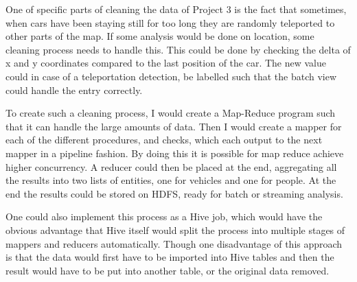 \newpar One of specific parts of cleaning the data of Project 3 is the fact that sometimes, when cars have been staying still for too long they are randomly teleported to other parts of the map. If some analysis would be done on location, some cleaning process needs to handle this. This could be done by checking the delta of x and y coordinates compared to the last position of the car. The new value could in case of a teleportation detection, be labelled such that the batch view could handle the entry correctly.

\newpar To create such a cleaning process, I would create a Map-Reduce program such that it can handle the large amounts of data. Then I would create a mapper for each of the different procedures, and checks, which each output to the next mapper in a pipeline fashion. By doing this it is possible for map reduce achieve higher concurrency. A reducer could then be placed at the end, aggregating all the results into two lists of entities, one for vehicles and one for people. At the end the results could be stored on HDFS, ready for batch or streaming analysis.

One could also implement this process as a Hive job, which would have the obvious advantage that Hive itself would split the process into multiple stages of mappers and reducers automatically. Though one disadvantage of this approach is that the data would first have to be imported into Hive tables and then the result would have to be put into another table, or the original data removed.